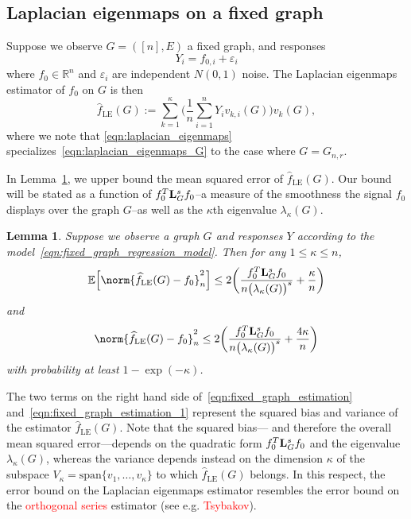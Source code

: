 \documentclass{article}
\newcommand{\Reals}{\mathbb{R}}
\newcommand{\1}{\mathbf{1}}
\newcommand{\Lap}{{\bf L}}
\newcommand{\Ebb}{\mathbb{E}}
\newcommand{\wh}[1]{\widehat{#1}}
\newcommand{\LE}{\mathrm{LE}}
\theoremstyle{alden}
\theoremstyle{aldenthm}
\newtheorem{lemma}{Lemma}
\theoremstyle{definition}
\theoremstyle{remark}
\begin{document}
\subsection{Laplacian eigenmaps on a fixed graph}
Suppose we observe $G = ([n],E)$ a fixed graph, and responses
\begin{equation}
\label{eqn:fixed_graph_regression_model}
Y_i = f_{0,i} + \varepsilon_i
\end{equation}
where $f_0 \in \Reals^n$ and $\varepsilon_i$ are independent $N(0,1)$ noise. The Laplacian eigenmaps estimator of $f_0$ on $G$ is then
\begin{equation}
\label{eqn:laplacian_eigenmaps_G}
\wh{f}_{\LE}(G) := \sum_{k = 1}^{\kappa} \biggl(\frac{1}{n}\sum_{i = 1}^{n} Y_i v_{k,i}(G) \biggr) v_k(G),
\end{equation}
where we note that \eqref{eqn:laplacian_eigenmaps} specializes~\eqref{eqn:laplacian_eigenmaps_G} to the case where $G = G_{n,r}$.

In Lemma~\ref{lem:fixed_graph_estimation}, we upper bound the mean squared error of $\wh{f}_{\LE}(G)$. Our bound will be stated as a function of $f_0^T \Lap_G^s f_0$--a measure of the smoothness the signal $f_0$ displays over the graph $G$--as well as the $\kappa$th eigenvalue $\lambda_{\kappa}(G)$.

\begin{lemma}
	\label{lem:fixed_graph_estimation}
	Suppose we observe a graph $G$ and responses $Y$ according to the model~\eqref{eqn:fixed_graph_regression_model}. Then for any $1 \leq \kappa \leq n$, 
	\begin{equation}
	\label{eqn:fixed_graph_estimation}
	\Ebb\Bigl[\norm{\wh{f}_{\LE}(G) - f_0}_n^2\Bigr] \leq 2\biggl(\frac{f_0^T \Lap_{G}^s f_0}{n \bigl(\lambda_{\kappa}(G)\bigr)^s} + \frac{\kappa}{n}\biggr)
	\end{equation}
	and
	\begin{equation}
	\label{eqn:fixed_graph_estimation_1}
	\norm{\wh{f}_{\LE}(G) - f_0}_n^2 \leq 2\biggl(\frac{f_0^T \Lap_{G}^s f_0}{n \bigl(\lambda_{\kappa}(G)\bigr)^s} + \frac{4\kappa}{n}\biggr)
	\end{equation}
	with probability at least $1 - \exp(-\kappa)$.
\end{lemma}
The two terms on the right hand side of~\eqref{eqn:fixed_graph_estimation} and~\eqref{eqn:fixed_graph_estimation_1} represent the squared bias and variance of the estimator $\wh{f}_{\LE}(G)$. Note that the squared bias--- and therefore the overall mean squared error---depends on the quadratic form $f_0^T \Lap_{G}^s f_0$ and the eigenvalue $\lambda_{\kappa}(G)$, whereas the variance depends instead on the dimension $\kappa$ of the subspace $V_{\kappa} = \textrm{span}\{v_1,\ldots,v_{\kappa}\}$ to which $\wh{f}_{\LE}(G)$ belongs. In this respect, the error bound on the Laplacian eigenmaps estimator resembles the error bound on the \textcolor{red}{orthogonal series} estimator (see e.g. \textcolor{red}{Tsybakov}).
\end{document}
